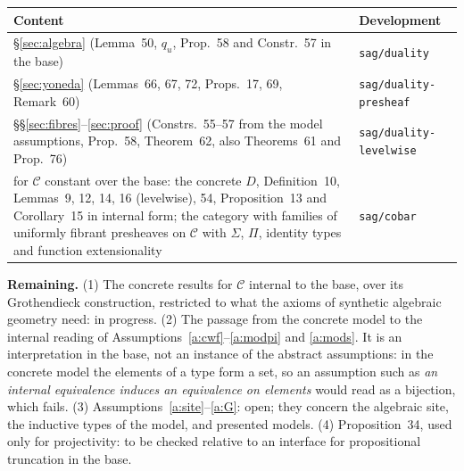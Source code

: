 \documentclass[11pt]{amsart}
\theoremstyle{definition}
\theoremstyle{remark}
\begin{document}
\medskip
\begin{tabular}{@{}p{}p{}@{}}
\toprule
Content & Development\\
\midrule
\S\ref{sec:algebra} (Lemma~50, $q_u$, Prop.~58 and Constr.~57 in the base)
& \texttt{sag/duality}\\
\S\ref{sec:yoneda} (Lemmas~66, 67, 72, Props.~17, 69, Remark~60)
& \texttt{sag/duality-presheaf}\\
\S\S\ref{sec:fibres}--\ref{sec:proof} (Constrs.~55--57 from the model
assumptions, Prop.~58, Theorem~62, also Theorems~61 and Prop.~76)
& \texttt{sag/duality-levelwise}\\
for $\mathcal C$ constant over the base: the concrete $D$, Definition~10, Lemmas~9, 12, 14, 16
(levelwise), 54, Proposition~13 and Corollary~15 in internal form; the
category with families of uniformly fibrant presheaves on $\mathcal C$
with $\Sigma$, $\Pi$, identity types and function extensionality
& \texttt{sag/cobar}\\
\bottomrule
\end{tabular}

\medskip
\noindent\textbf{Remaining.} (1) The concrete results for $\mathcal C$
internal to the base, over its Grothendieck construction, restricted to what
the axioms of synthetic algebraic geometry need: in progress.
(2) The passage from the concrete model to the internal reading of
Assumptions~\ref{a:cwf}--\ref{a:modpi} and \ref{a:mods}. It is an
interpretation in the base, not an instance of the abstract assumptions:
in the concrete model the elements of a type form a set, so an
assumption such as \emph{an internal equivalence induces an equivalence on
elements} would read as a bijection, which fails.
(3) Assumptions~\ref{a:site}--\ref{a:G}: open; they concern the algebraic
site, the inductive types of the model, and presented models.
(4) Proposition~34, used only for projectivity: to be checked relative to an
interface for propositional truncation in the base.
\end{document}
